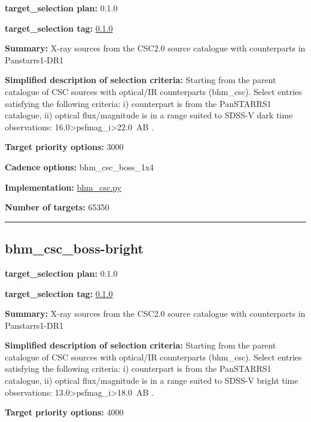 \noindent\textbf{target\_selection plan:} 0.1.0

\noindent\textbf{target\_selection tag:}
\href{https://github.com/sdss/target_selection/tree/0.1.0/}{0.1.0}

\noindent\textbf{Summary:} X-ray sources from the CSC2.0 source catalogue with
counterparts in Panstarrs1-DR1

\noindent\textbf{Simplified description of selection criteria:} Starting from the
parent catalogue of CSC sources with optical/IR counterparts (bhm\_csc).
Select entries satisfying the following criteria: i) counterpart is from
the PanSTARRS1 catalogue, ii) optical flux/magnitude is in a range
suited to SDSS-V dark time observations:
16.0\textgreater psfmag\_i\textgreater22.0~AB .


\noindent\textbf{Target priority options:} 3000

\noindent\textbf{Cadence options:} bhm\_csc\_boss\_1x4

\noindent\textbf{Implementation:}
\href{https://github.com/sdss/target_selection/blob/0.1.0/python/target_selection/cartons/bhm_csc.py}{bhm\_csc.py}

\noindent\textbf{Number of targets:} 65350

\begin{center}\rule{0.5\linewidth}{0.5pt}\end{center}

\hypertarget{bhm_csc_boss-bright_plan0.1.0}{%
\subsection{bhm\_csc\_boss-bright}\label{bhm_csc_boss-bright_plan0.1.0}}

\noindent\textbf{target\_selection plan:} 0.1.0

\noindent\textbf{target\_selection tag:}
\href{https://github.com/sdss/target_selection/tree/0.1.0/}{0.1.0}

\noindent\textbf{Summary:} X-ray sources from the CSC2.0 source catalogue with
counterparts in Panstarrs1-DR1

\noindent\textbf{Simplified description of selection criteria:} Starting from the
parent catalogue of CSC sources with optical/IR counterparts (bhm\_csc).
Select entries satisfying the following criteria: i) counterpart is from
the PanSTARRS1 catalogue, ii) optical flux/magnitude is in a range
suited to SDSS-V bright time observations:
13.0\textgreater psfmag\_i\textgreater18.0~AB .


\noindent\textbf{Target priority options:} 4000

